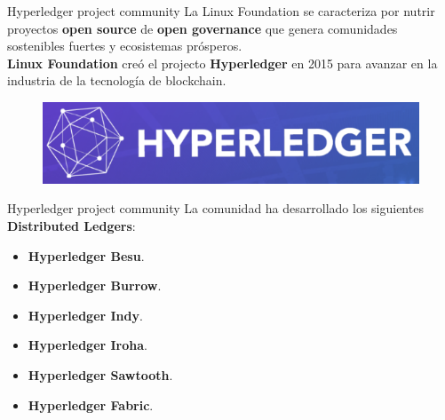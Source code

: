 \documentclass{beamer}
\begin{document}
	\begin{frame}
		\begin{block}{Hyperledger project community}
			La Linux Foundation se caracteriza por nutrir proyectos \textbf{open source} de \textbf{open governance} que genera comunidades sostenibles fuertes y ecosistemas prósperos.\\
			\vspace{4mm}
			\textbf{Linux Foundation} creó el projecto \textbf{Hyperledger} en 2015 para avanzar en la industria de la tecnología de blockchain.
			\begin{figure}[h]
				\includegraphics[scale=.3]{hyperledger_logo}
				\centering
			\end{figure}
		\end{block}
	\end{frame}

	\begin{frame}
		\begin{block}{Hyperledger project community}
			La comunidad ha desarrollado los siguientes \textbf{Distributed Ledgers}:

			\begin{itemize}
				\item \textbf{Hyperledger Besu}.
				\item \textbf{Hyperledger Burrow}.
				\item \textbf{Hyperledger Indy}.
				\item \textbf{Hyperledger Iroha}.
				\item \textbf{Hyperledger Sawtooth}.
				\item \textbf{Hyperledger Fabric}.
			\end{itemize}
		\end{block}
	\end{frame}
\end{document}
